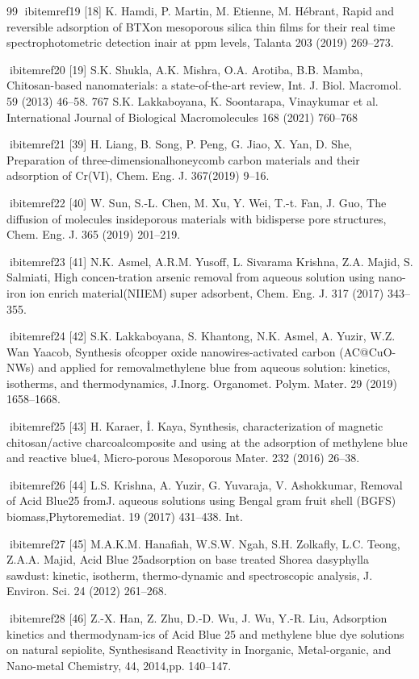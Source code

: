 \documentclass[final,5p,times,twocolumn,authoryear]{elsarticle}
\begin{document}
\begin{thebibliography}{99}
ibitem{ref19} [18] K. Hamdi, P. Martin, M. Etienne, M. Hébrant, Rapid and reversible adsorption of BTXon mesoporous silica thin ﬁlms for their real time spectrophotometric detection inair at ppm levels, Talanta 203 (2019) 269–273.

ibitem{ref20} [19] S.K. Shukla, A.K. Mishra, O.A. Arotiba, B.B. Mamba, Chitosan-based nanomaterials: a state-of-the-art review, Int. J. Biol. Macromol. 59 (2013) 46–58. 767 S.K. Lakkaboyana, K. Soontarapa, Vinaykumar et al. International Journal of Biological Macromolecules 168 (2021) 760–768

ibitem{ref21} [39] H. Liang, B. Song, P. Peng, G. Jiao, X. Yan, D. She, Preparation of three-dimensionalhoneycomb carbon materials and their adsorption of Cr(VI), Chem. Eng. J. 367(2019) 9–16.

ibitem{ref22} [40] W. Sun, S.-L. Chen, M. Xu, Y. Wei, T.-t. Fan, J. Guo, The diffusion of molecules insideporous materials with bidisperse pore structures, Chem. Eng. J. 365 (2019) 201–219.

ibitem{ref23} [41] N.K. Asmel, A.R.M. Yusoff, L. Sivarama Krishna, Z.A. Majid, S. Salmiati, High concen-tration arsenic removal from aqueous solution using nano-iron ion enrich material(NIIEM) super adsorbent, Chem. Eng. J. 317 (2017) 343–355.

ibitem{ref24} [42] S.K. Lakkaboyana, S. Khantong, N.K. Asmel, A. Yuzir, W.Z. Wan Yaacob, Synthesis ofcopper oxide nanowires-activated carbon (AC@CuO-NWs) and applied for removalmethylene blue from aqueous solution: kinetics, isotherms, and thermodynamics, J.Inorg. Organomet. Polym. Mater. 29 (2019) 1658–1668.

ibitem{ref25} [43] H. Karaer, İ. Kaya, Synthesis, characterization of magnetic chitosan/active charcoalcomposite and using at the adsorption of methylene blue and reactive blue4, Micro-porous Mesoporous Mater. 232 (2016) 26–38.

ibitem{ref26} [44] L.S. Krishna, A. Yuzir, G. Yuvaraja, V. Ashokkumar, Removal of Acid Blue25 fromJ. aqueous solutions using Bengal gram fruit shell (BGFS) biomass,Phytoremediat. 19 (2017) 431–438. Int.

ibitem{ref27} [45] M.A.K.M. Hanaﬁah, W.S.W. Ngah, S.H. Zolkaﬂy, L.C. Teong, Z.A.A. Majid, Acid Blue 25adsorption on base treated Shorea dasyphylla sawdust: kinetic, isotherm, thermo-dynamic and spectroscopic analysis, J. Environ. Sci. 24 (2012) 261–268.

ibitem{ref28} [46] Z.-X. Han, Z. Zhu, D.-D. Wu, J. Wu, Y.-R. Liu, Adsorption kinetics and thermodynam-ics of Acid Blue 25 and methylene blue dye solutions on natural sepiolite, Synthesisand Reactivity in Inorganic, Metal-organic, and Nano-metal Chemistry, 44, 2014,pp. 140–147.


\end{thebibliography}
\end{document}
